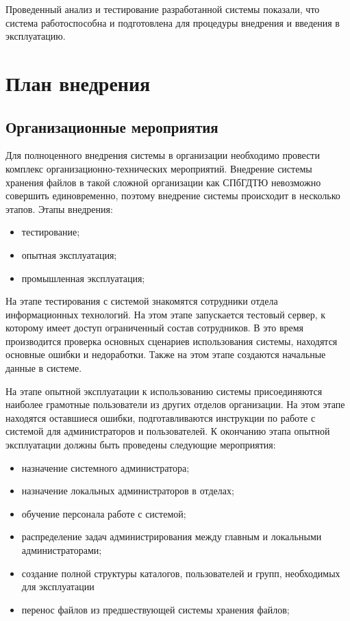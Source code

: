 \documentclass[utf8,usehyperref,12pt]{G7-32}
\begin{document}
Проведенный анализ и тестирование разработанной системы показали, что система работоспособна и подготовлена для процедуры внедрения и введения в  эксплуатацию.

\section{План внедрения}
\subsection{Организационные мероприятия}
Для полноценного внедрения системы в организации необходимо провести комплекс организационно-технических мероприятий. Внедрение системы хранения файлов в такой сложной организации как СПбГДТЮ невозможно совершить единовременно, поэтому внедрение системы происходит в несколько этапов. Этапы внедрения:
\begin{itemize}
 \item тестирование;
 \item опытная эксплуатация;
 \item промышленная эксплуатация;
\end{itemize}

На этапе тестирования с системой знакомятся сотрудники отдела информационных технологий. На этом этапе запускается тестовый сервер, к которому имеет доступ ограниченный состав сотрудников. В это время производится проверка основных сценариев использования системы, находятся основные ошибки и недоработки. Также на этом этапе создаются начальные данные в системе.

На этапе опытной эксплуатации к использованию системы присоединяются наиболее грамотные пользователи из других отделов организации. На этом этапе находятся оставшиеся ошибки, подготавливаются инструкции по работе с системой для администраторов и пользователей. К окончанию этапа опытной эксплуатации должны быть проведены следующие мероприятия:

\begin{itemize}
 \item назначение системного администратора;
 \item назначение локальных администраторов в отделах;
 \item обучение персонала работе с системой;
 \item распределение задач администрирования между главным и локальными администраторами;
 \item создание полной структуры каталогов, пользователей и групп, необходимых для эксплуатации
 \item перенос файлов из предшествующей системы хранения файлов;
\end{itemize}
\end{document}
